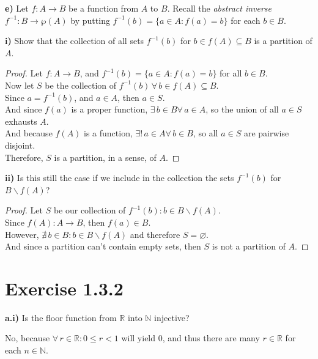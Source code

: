 \documentclass[titlepage, letterpaper, fleqn]{article}
\newcommand{\spacepls}{\vspace{5mm}}
\begin{document}
\spacepls

{\large \textbf{e)} Let \(f\colon A \to B\) be a function from \(A\) to \(B\). Recall the \textit{abstract inverse} \(f^{-1}\colon B \to \wp (A)\) by putting \(f^{-1}(b)= \{a \in A \colon f(a) = b\}\) for each \(b \in B\).}

\spacepls

\textbf{i)} Show that the collection of all sets \(f^{-1}(b)\) for \(b \in f(A) \subseteq B\) is a partition of \(A\).

\begin{proof}
Let \(f\colon A \to B\), and \(f^{-1}(b) = \{a \in A\colon f(a)=b\}\) for all \(b \in B\).\\
Now let \(S\) be the collection of \(f^{-1}(b) \, \forall \, b \in f(A) \subseteq B\).\\
Since \(a = f^{-1}(b)\), and \(a \in A\), then \(a \in S\).\\
And since \(f(a)\) is a proper function, \(\exists \, b \in B \forall \, a \in A\), so the union of all \(a \in S\) exhausts \(A\).\\
And because \(f(A)\) is a function, \(\exists ! \, a \in A \forall \, b \in B\), so all \(a \in S\) are pairwise disjoint.\\
Therefore, \(S\) is a partition, in a sense, of \(A\).
\end{proof}

\spacepls

\textbf{ii)} Is this still the case if we include in the collection the sets \(f^{-1}(b)\) for \(B \backslash f(A)\)?

\begin{proof}
Let \(S\) be our collection of \(f^{-1}(b) \colon b \in B \backslash f(A)\).\\
Since \(f(A) \colon A \to B\), then \(f(a) \in B\).\\
However, \(\nexists \, b \in B \colon b \in B \backslash f(A)\) and therefore \(S = \varnothing\).\\
And since a partition can't contain empty sets, then \(S\) is not a partition of \(A\).
\end{proof}

\section{Exercise 1.3.2}

{\large \textbf{a.i)} Is the floor function from \(\mathbb{R}\) into \(\mathbb{N}\) injective?}

No, because \(\forall \, r \in \mathbb{R} \colon 0 \leq r < 1\) will yield 0, and thus there are many \(r \in \mathbb{R}\) for each \(n \in \mathbb{N}\).
\end{document}
